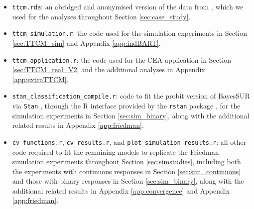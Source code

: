 \documentclass[aoas,preprint]{imsart}
\theoremstyle{plain}
\theoremstyle{definition}
\theoremstyle{remark}
\begin{document}
\begin{appendix}
\begin{itemize}[wide]
    \item \texttt{ttcm.rda}: an abridged and anonymised version of the data from \citet{wiertsema2019cost}, which we used for the analyses throughout Section \ref{sec:case_study}.
    \item \texttt{ttcm\_simulation.r}: the code used for the simulation experiments in Section \ref{sec:TTCM_sim} and Appendix \ref{app:indBART}.
    \item \texttt{ttcm\_application.r}: the code used for the CEA application in Section \ref{sec:TTCM_real_V2} and the additional analyses in Appendix \ref{app:extraTTCM}.
    \item \texttt{stan\_classification\_compile.r}: code to fit the probit version of BayesSUR via \texttt{Stan} \citep{stanusersguide}, through the \textsf{R} interface provided by the \texttt{rstan} package \citep{rstanref}, for the simulation experiments in Section \ref{sec:sim_binary}, along with the additional related results in Appendix \ref{app:friedman}.
    \item \texttt{cv\_functions.r}, \texttt{cv\_results.r}, and \texttt{plot\_simulation\_results.r}: all other code required to fit the remaining models to replicate the Friedman simulation experiments throughout Section \ref{sec:simstudies}, including both the experiments with continuous responses in Section \ref{sec:sim_continuous} and those with binary responses in Section \ref{sec:sim_binary}, along with the additional related results in Appendix \ref{app:convergence} and Appendix \ref{app:friedman}.
\end{itemize}


\end{appendix}






\end{document}
